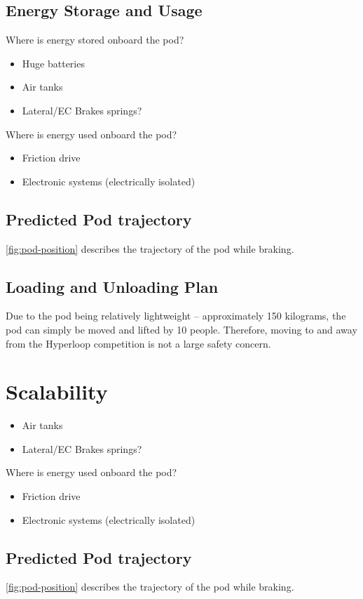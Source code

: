 \documentclass[main.tex]{subfiles}
\begin{document}
\subsection{Energy Storage and Usage}
Where is energy stored onboard the pod?
\begin{itemize}
    \item Huge batteries
    \item Air tanks
    \item Lateral/EC Brakes springs?
\end{itemize}
Where is energy used onboard the pod?
\begin{itemize}
    \item Friction drive
    \item Electronic systems (electrically isolated)
\end{itemize}

\subsection{Predicted Pod trajectory}
\ref{fig:pod-position} describes the trajectory of the pod while braking.\\

\subsection{Loading and Unloading Plan}
Due to the pod being relatively lightweight – approximately 150 kilograms, the pod can simply be moved and lifted by 10 people. Therefore, moving to and away from the Hyperloop competition is not a large safety concern.

\section{Scalability}
\begin{itemize}
    \item Air tanks
    \item Lateral/EC Brakes springs?
\end{itemize}

Where is energy used onboard the pod?
\begin{itemize}
    \item Friction drive
    \item Electronic systems (electrically isolated)
\end{itemize}

\subsection{Predicted Pod trajectory}
\ref{fig:pod-position} describes the trajectory of the pod while braking.\\
\end{document}

